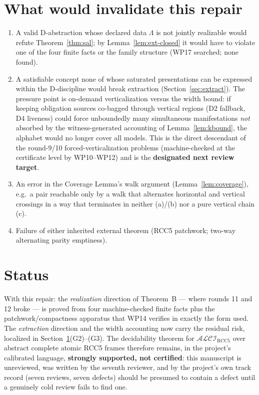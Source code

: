 \documentclass[11pt]{article}
\theoremstyle{definition}
\newcommand{\ALCIRCC}{\mathcal{ALCI}_{\mathrm{RCC5}}}
\begin{document}
\section{What would invalidate this repair}\label{sec:invalidate}

\begin{enumerate}[label=(G\arabic*),leftmargin=2.6em]
\item A valid D-abstraction whose declared data $\Lambda$ is not jointly
realizable would refute Theorem~\ref{thm:sal}; by
Lemma~\ref{lem:ext-closed} it would have to violate one of the four
finite facts or the family structure (WP17 searched; none found).
\item A satisfiable concept none of whose saturated presentations can be
expressed within the D-discipline would break extraction
(Section~\ref{sec:extract}).  The pressure point is on-demand
verticalization versus the width bound: if keeping obligation sources
co-bagged through vertical regions (D2 fallback, D4 liveness) could force
unboundedly many simultaneous manifestations \emph{not} absorbed by the
witness-generated accounting of Lemma~\ref{lem:kbound}, the alphabet
would no longer cover all models.  This is the direct descendant of the
round-9/10 forced-verticalization problems (machine-checked at the
certificate level by WP10--WP12) and is the \textbf{designated next
review target}.
\item An error in the Coverage Lemma's walk argument
(Lemma~\ref{lem:coverage}), e.g.\ a pair reachable only by a walk that
alternates horizontal and vertical crossings in a way that terminates in
neither (a)/(b) nor a pure vertical chain (c).
\item Failure of either inherited external theorem (RCC5 patchwork;
two-way alternating parity emptiness).
\end{enumerate}

\section{Status}

With this repair: the \emph{realization} direction of Theorem~B ---
where rounds 11 and 12 broke --- is proved from four machine-checked
finite facts plus the patchwork/compactness apparatus that WP14 verifies
in exactly the form used.  The \emph{extraction} direction and the width
accounting now carry the residual risk, localized in
Section~\ref{sec:invalidate}(G2)--(G3).  The decidability theorem for
$\ALCIRCC$ over abstract complete atomic RCC5 frames therefore remains,
in the project's calibrated language, \textbf{strongly supported, not
certified}: this manuscript is unreviewed, was written by the seventh
reviewer, and by the project's own track record (seven reviews, seven
defects) should be presumed to contain a defect until a genuinely cold
review fails to find one.
\end{document}
